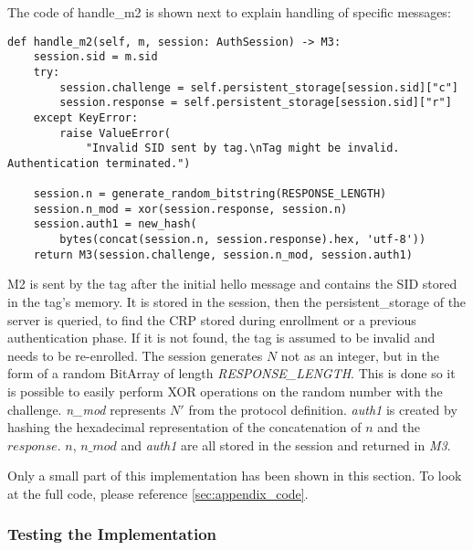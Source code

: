 The code of handle\_m2 is shown next to explain handling of specific messages:

\begin{lstlisting}
def handle_m2(self, m, session: AuthSession) -> M3:
    session.sid = m.sid
    try:
        session.challenge = self.persistent_storage[session.sid]["c"]
        session.response = self.persistent_storage[session.sid]["r"]
    except KeyError:
        raise ValueError(
            "Invalid SID sent by tag.\nTag might be invalid. Authentication terminated.")

    session.n = generate_random_bitstring(RESPONSE_LENGTH)
    session.n_mod = xor(session.response, session.n)
    session.auth1 = new_hash(
        bytes(concat(session.n, session.response).hex, 'utf-8'))
    return M3(session.challenge, session.n_mod, session.auth1)
\end{lstlisting}

M2 is sent by the tag after the initial hello message and contains the SID stored in the tag's memory.
It is stored in the session, then the persistent\_storage of the server is queried, to find the
CRP stored during enrollment or a previous authentication phase. If it is not found, the tag is assumed to
be invalid and needs to be re-enrolled.
The session generates $N$ not as an integer, but in the form of a random BitArray of length \emph{RESPONSE\_LENGTH}.
This is done so it is possible to easily perform XOR operations on the random number with the challenge.
\emph{n\_mod} represents $N'$ from the protocol definition.
\emph{auth1} is created by hashing the hexadecimal representation of the concatenation of $n$ and the $response$.
$n$, $n\_mod$ and \emph{auth1} are all stored in the session and returned in \emph{M3}.

Only a small part of this implementation has been shown in this section. To look at the full code, please reference
\ref{sec:appendix_code}.

\subsubsection{Testing the Implementation}

